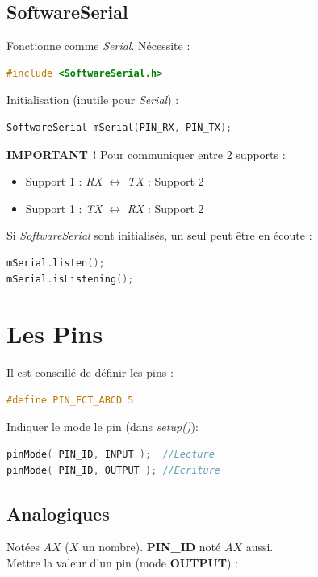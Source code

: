         \subsection{SoftwareSerial}
            Fonctionne comme \textit{Serial}. Nécessite :
            \begin{lstlisting}[language=C]
#include <SoftwareSerial.h>
            \end{lstlisting}
            Initialisation (inutile pour \textit{Serial}) :
            \begin{lstlisting}[language=C]
SoftwareSerial mSerial(PIN_RX, PIN_TX);
            \end{lstlisting}
            \textbf{IMPORTANT !} Pour communiquer entre 2 supports :
            \begin{itemize}
                \item Support 1 : \textit{RX} $\leftrightarrow$ \textit{TX} : Support 2
                \item Support 1 : \textit{TX} $\leftrightarrow$ \textit{RX} : Support 2
            \end{itemize}
            Si \textit{SoftwareSerial} sont initialisés, un seul peut être en écoute :
            \begin{lstlisting}[language=C]
mSerial.listen();
mSerial.isListening();
            \end{lstlisting}

    \section{Les Pins}
        Il est conseillé de définir les pins :
        \begin{lstlisting}[language=C]
#define PIN_FCT_ABCD 5
        \end{lstlisting}

        Indiquer le mode le pin (dans \textit{setup()}):

        \begin{lstlisting}[language=C]
pinMode( PIN_ID, INPUT );  //Lecture
pinMode( PIN_ID, OUTPUT ); //Ecriture
        \end{lstlisting}

        \subsection{Analogiques}
            Notées $AX$ ($X$ un nombre). \textbf{PIN\_ID} noté $AX$ aussi.\\
            Mettre la valeur d'un pin (mode \textbf{OUTPUT}) :

